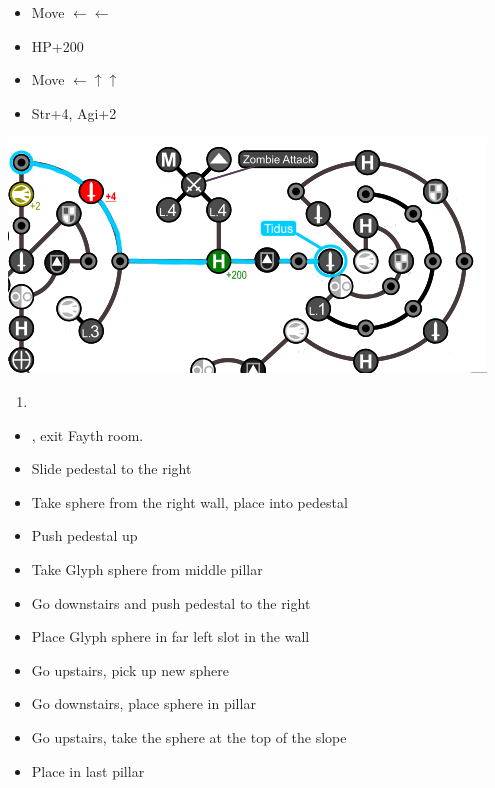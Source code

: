 \begin{spheregrid}
	\begin{itemize}
		\tidusf
		\begin{itemize}
			\item Move $\leftarrow\leftarrow$
			\item HP+200
			\item Move $\leftarrow\uparrow\uparrow$
			\item Str+4, Agi+2
		\end{itemize}
		\includegraphics{graphics/Tidus_Post_Seymour}
	\end{itemize}
\end{spheregrid}
\begin{enumerate}[resume]
	\item \formation{\rikku}{\tidus}{\yuna}
\end{enumerate}
\begin{trial}
	\begin{itemize}
		\item \save, exit Fayth room.
		\item Slide pedestal to the right
		\item Take sphere from the right wall, place into pedestal
		\item Push pedestal up
		\item Take Glyph sphere from middle pillar
		\item Go downstairs and push pedestal to the right
		\item Place Glyph sphere in far left slot in the wall
		\item Go upstairs, pick up new sphere
		\item Go downstairs, place sphere in pillar
		\item Go upstairs, take the sphere at the top of the slope
		\item Place in last pillar
	\end{itemize}
\end{trial}
